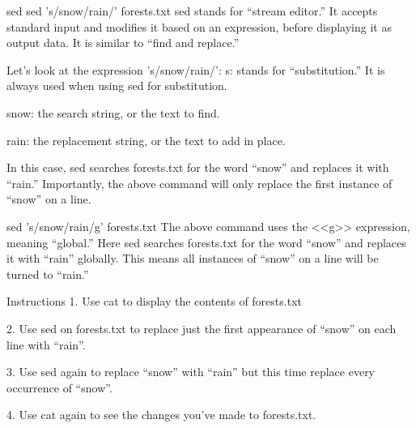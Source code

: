 sed
        sed 's/snow/rain/' forests.txt 
    sed stands for “stream editor.” It accepts standard input and modifies it based on an expression, before displaying it as output data. It is similar to “find and replace.”

    Let’s look at the expression 's/snow/rain/':
        s: stands for “substitution.” It is always used when using sed for substitution.
        
        snow: the search string, or the text to find.
    
        rain: the replacement string, or the text to add in place.
    
    In this case, sed searches forests.txt for the word “snow” and replaces it with “rain.” Importantly, the above command will only replace the first instance of “snow” on a line.

        sed 's/snow/rain/g' forests.txt 
    The above command uses the <<g>> expression, meaning “global.” Here sed searches forests.txt for the word “snow” and replaces it with “rain” globally. This means all instances of “snow” on a line will be turned to “rain.”

Instructions
    1.
    Use cat to display the contents of forests.txt

    2.
    Use sed on forests.txt to replace just the first appearance of “snow” on each line with “rain”.

    3.
    Use sed again to replace “snow” with “rain” but this time replace every occurrence of “snow”.

    4.
    Use cat again to see the changes you’ve made to forests.txt.    